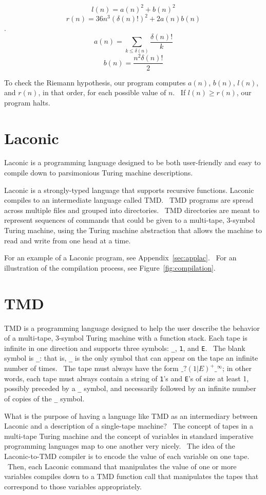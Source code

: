 \documentclass[11pt]{article}
\begin{document}
$$l(n) = a(n)^2 + b(n)^2$$
$$r(n) = 36n^3(\delta(n)!)^2 + 2a(n)b(n)$$.
$$a(n) = \sum_{k \le \delta(n)} \frac{\delta(n)!}{k}$$
$$b(n) = \frac{n^2 \delta(n)!}{2}$$

To check the Riemann hypothesis, our program computes $a(n)$, $b(n)$, $l(n)$, and $r(n)$, in that order, for each possible value of $n$. \ If $l(n) \ge r(n)$, our program halts.

\section{Laconic}

Laconic is a programming language designed to be both user-friendly and easy to compile down to parsimonious Turing machine descriptions.

Laconic is a strongly-typed language that supports recursive functions. Laconic compiles to an intermediate language called TMD. \ TMD programs are spread across multiple files and grouped into directories. \ TMD directories are meant to represent sequences of commands that could be given to a multi-tape, $3$-symbol Turing machine, using the Turing machine abstraction that allows the machine to read and write from one head at a time.

For an example of a Laconic program, see Appendix~\ref{sec:applac}. \ For an illustration of the compilation process, see Figure~\ref{fig:compilation}.

\section{TMD}

TMD is a programming language designed to help the user describe the behavior of a multi-tape, $3$-symbol Turing machine with a function stack. Each tape is infinite in one direction and supports three symbols: \texttt{\_}, \texttt{1}, and \texttt{E}. \ The blank symbol is \texttt{\_}: that is, \texttt{\_} is the only symbol that can appear on the tape an infinite number of times. \ The tape must always have the form $\texttt{\_}?(1|E)^+\texttt{\_}^{\infty}$; in other words, each tape must always contain a string of \texttt{1}'s and \texttt{E}'s of size at least 1, possibly preceded by a \texttt{\_} symbol, and necessarily followed by an infinite number of copies of the \texttt{\_} symbol.

What is the purpose of having a language like TMD as an intermediary between Laconic and a description of a single-tape machine? \ The concept of tapes in a multi-tape Turing machine and the concept of variables in standard imperative programming languages map to one another very nicely. \ The idea of the Laconic-to-TMD compiler is to encode the value of each variable on one tape. \ Then, each Laconic command that manipulates the value of one or more variables compiles down to a TMD function call that manipulates the tapes that correspond to those variables appropriately.
\end{document}

